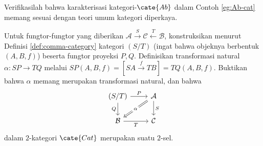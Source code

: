 \begin{Exercises}
	\item Verifikasilah bahwa karakterisasi kategori-$\cate{Ab}$ dalam Contoh \ref{eg:Ab-cat} memang sesuai dengan teori umum kategori diperkaya.
	\item Untuk fungtor-fungtor yang diberikan $\mathcal{A} \xrightarrow{S} \mathcal{C} \xleftarrow{T} \mathcal{B}$, konstruksikan menurut Definisi \ref{def:comma-category} kategori $(S/T)$ (ingat bahwa objeknya berbentuk $(A,B,f)$) beserta fungtor proyeksi $P,Q$. Definisikan transformasi natural $\alpha: SP \to TQ$ melalui $SP(A,B,f) = \left[ SA \xrightarrow{f} TB \right] = TQ(A,B,f)$. Buktikan bahwa $\alpha$ memang merupakan transformasi natural, dan bahwa
		\[\begin{tikzcd}
			(S/T) \arrow[r, "P"] \arrow[d, "Q"'] & \mathcal{A} \arrow[d, "S"] \arrow[Rightarrow, ld, "\alpha" description] \\
			\mathcal{B} \arrow[r, "T"'] & \mathcal{C}
		\end{tikzcd}\]
		dalam $2$-kategori $\cate{Cat}$ merupakan suatu $2$-sel.
\end{Exercises}

